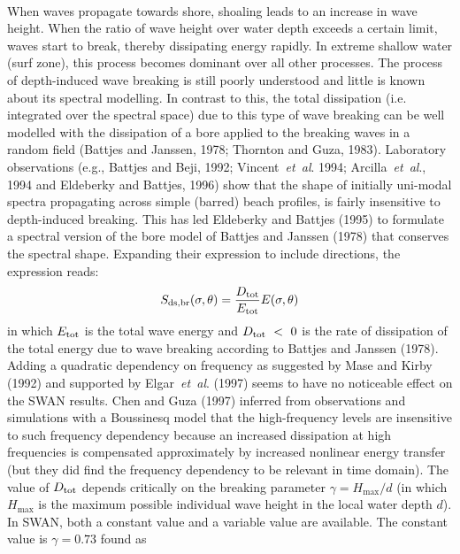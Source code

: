 \documentclass[12pt]{book}
\begin{document}
\nocite{She78HHH,Ber94C,Put49J,JON73,Has68C,Col72,Mad88PG,Web89,Web91a,Web91b,Luo94M}
\\[2ex]
\noindent
When waves propagate towards shore, shoaling leads to an increase in wave height. When the ratio
of wave height over water depth exceeds a certain limit, waves start to break, thereby dissipating
energy rapidly. In extreme shallow water (surf zone), this process becomes dominant over all other
processes. The process of depth-induced wave breaking is still poorly understood and little is
known about its spectral modelling. In contrast to this, the total dissipation (i.e. integrated
over the spectral space) due to this type of wave breaking can be well modelled with the dissipation
of a bore applied to the breaking waves
in a random field (Battjes and Janssen, 1978; Thornton and Guza, 1983). Laboratory observations (e.g.,
Battjes and Beji, 1992; Vincent~{\it et~al}. 1994; Arcilla~{\it et~al}., 1994 and Eldeberky and Battjes, 1996) show that
the shape of initially uni-modal spectra propagating across simple (barred) beach profiles, is fairly
insensitive to depth-induced breaking. This has led Eldeberky and Battjes (1995) to formulate a spectral
version of the bore model of Battjes and Janssen (1978) that conserves the spectral shape. Expanding
their expression to include directions, the expression reads:
\begin{equation}
  S_{\rm ds,br} (\sigma,\theta) = \frac{D_{\rm tot}}{E_{\rm tot}} E(\sigma,\theta)
  \label{eq2-8}
\end{equation}
in which $E_{\rm tot}$ is the total wave energy and $D_{\rm tot}~<~0$ is the rate of dissipation of
the total energy due to wave breaking according to Battjes and Janssen (1978). Adding a quadratic dependency
on frequency as suggested by Mase and Kirby (1992) and supported by Elgar~{\it et~al}. (1997) seems to have no
noticeable effect on the SWAN results. Chen and Guza (1997) inferred from observations and simulations with a
Boussinesq model that the high-frequency levels are insensitive to such frequency dependency because
an increased dissipation at high frequencies is compensated approximately by increased nonlinear
energy transfer (but they did find the frequency dependency to be relevant in time domain). The value of
$D_{\rm tot}$ depends critically on the breaking parameter $\gamma = H_{\max}/d$
(in which $H_{\max}$ is the maximum possible individual wave height in the local water depth $d$).
In SWAN, both a constant value and a variable value are available. The constant value is $\gamma=0.73$ found as
\end{document}
